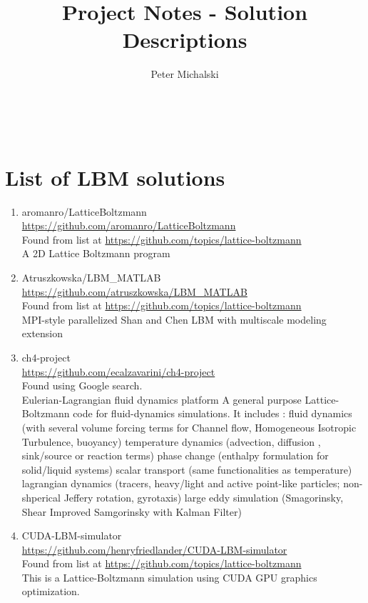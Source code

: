 \documentclass{article}
\title{Project Notes - Solution Descriptions}
\author{Peter Michalski}
\date{}
\begin{document}
\maketitle

~\newpage


\section{List of LBM solutions}
\begin{enumerate}
\item aromanro/LatticeBoltzmann\\
\href{https://github.com/aromanro/LatticeBoltzmann}{https://github.com/aromanro/LatticeBoltzmann}\\
Found from list at \href{https://github.com/topics/lattice-boltzmann}{https://github.com/topics/lattice-boltzmann}\\
A 2D Lattice Boltzmann program

\item Atruszkowska/LBM\_MATLAB\\
\href{https://github.com/atruszkowska/LBM_MATLAB}{https://github.com/atruszkowska/LBM\_MATLAB}\\
Found from list at \href{https://github.com/topics/lattice-boltzmann}{https://github.com/topics/lattice-boltzmann}\\
MPI-style parallelized Shan and Chen LBM with multiscale modeling extension

\item ch4-project\\
\href{https://github.com/ecalzavarini/ch4-project}{https://github.com/ecalzavarini/ch4-project}\\  
Found using Google search.\\
Eulerian-Lagrangian fluid dynamics platform
A general purpose Lattice-Boltzmann code for fluid-dynamics simulations. It includes :
fluid dynamics (with several volume forcing terms for Channel flow, Homogeneous Isotropic Turbulence, buoyancy)
temperature dynamics (advection, diffusion , sink/source or reaction terms)
phase change (enthalpy formulation for solid/liquid systems)
scalar transport (same functionalities as temperature)
lagrangian dynamics (tracers, heavy/light and active point-like particles; non-shperical Jeffery rotation, gyrotaxis)
large eddy simulation (Smagorinsky, Shear Improved Samgorinsky with Kalman Filter)

\item CUDA-LBM-simulator\\
\href{https://github.com/henryfriedlander/CUDA-LBM-simulator}{https://github.com/henryfriedlander/CUDA-LBM-simulator}\\
Found from list at \href{https://github.com/topics/lattice-boltzmann}{https://github.com/topics/lattice-boltzmann}\\
This is a Lattice-Boltzmann simulation using CUDA GPU graphics optimization.


\end{enumerate}
\end{document}
